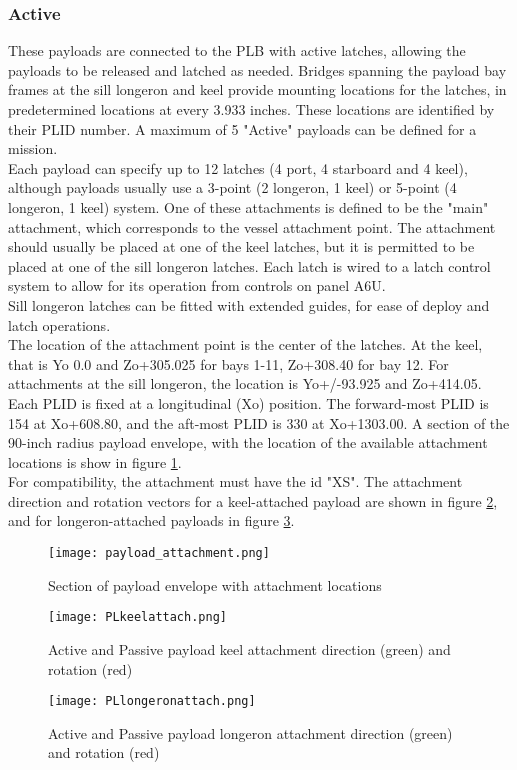 \documentclass[Space_Shuttle_Vessel_Manual.tex]{subfiles}
\begin{document}
\begin{multicols*}{2}
\subsubsection{Active}
\label{sec:activepl}
These payloads are connected to the PLB with active latches, allowing the payloads to be released and latched as needed. Bridges spanning the payload bay frames at the sill longeron and keel provide mounting locations for the latches, in predetermined locations at every 3.933 inches. These locations are identified by their PLID number.
A maximum of 5 "Active" payloads can be defined for a mission.
\\
Each payload can specify up to 12 latches (4 port, 4 starboard and 4 keel), although payloads usually use a 3-point (2 longeron, 1 keel) or 5-point (4 longeron, 1 keel) system.
One of these attachments is defined to be the "main" attachment, which corresponds to the vessel attachment point. The attachment should usually be placed at one of the keel latches, but it is permitted to be placed at one of the sill longeron latches. Each latch is wired to a latch control system to allow for its operation from controls on panel A6U.
\\
Sill longeron latches can be fitted with extended guides, for ease of deploy and latch operations.
\\
The location of the attachment point is the center of the latches. At the keel, that is Yo 0.0 and Zo+305.025 for bays 1-11, Zo+308.40 for bay 12. For attachments at the sill longeron, the location is Yo+/-93.925 and Zo+414.05. Each PLID is fixed at a longitudinal (Xo) position. The forward-most PLID is 154 at Xo+608.80, and the aft-most PLID is 330 at Xo+1303.00. A section of the 90-inch radius payload envelope, with the location of the available attachment locations is show in figure \ref{fig:payload_attachment}.
\\
For compatibility, the attachment must have the id "XS". The attachment direction and rotation vectors for a keel-attached payload are shown in figure \ref{fig:PLkeelattach}, and for longeron-attached payloads in figure \ref{fig:PLlongeronattach}.
\begin{figure}[H]
  \centering
  \captionsetup{justification=centering}
  \texttt{[image: payload\_attachment.png]}
  \caption{Section of payload envelope with attachment locations}
  \label{fig:payload_attachment}
\end{figure}
\begin{figure}[H]
  \centering
  \captionsetup{justification=centering}
  \texttt{[image: PLkeelattach.png]}
  \caption{Active and Passive payload keel attachment direction (green) and rotation (red)}
  \label{fig:PLkeelattach}
\end{figure}
\begin{figure}[H]
  \centering
  \captionsetup{justification=centering}
  \texttt{[image: PLlongeronattach.png]}
  \caption{Active and Passive payload longeron attachment direction (green) and rotation (red)}
  \label{fig:PLlongeronattach}
\end{figure}



\end{multicols*}
\end{document}
